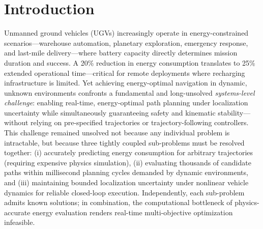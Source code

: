 \documentclass[pdflatex,sn-nature]{sn-jnl}%
\begin{document}

\maketitle

\section{Introduction}

Unmanned ground vehicles (UGVs) increasingly operate in energy-constrained scenarios—warehouse automation, planetary exploration, emergency response, and last-mile delivery—where battery capacity directly determines mission duration and success\cite{Mei2005,Tokekar2014}. A 20\% reduction in energy consumption translates to 25\% extended operational time—critical for remote deployments where recharging infrastructure is limited. Yet achieving energy-optimal navigation in dynamic, unknown environments confronts a fundamental and long-unsolved \emph{systems-level challenge}: enabling real-time, energy-optimal path planning under localization uncertainty while simultaneously guaranteeing safety and kinematic stability—without relying on pre-specified trajectories or trajectory-following controllers. This challenge remained unsolved not because any individual problem is intractable, but because three tightly coupled sub-problems must be resolved together: (i) accurately predicting energy consumption for arbitrary trajectories (requiring expensive physics simulation), (ii) evaluating thousands of candidate paths within millisecond planning cycles demanded by dynamic environments, and (iii) maintaining bounded localization uncertainty under nonlinear vehicle dynamics for reliable closed-loop execution. Independently, each sub-problem admits known solutions; in combination, the computational bottleneck of physics-accurate energy evaluation renders real-time multi-objective optimization infeasible.
\end{document}
